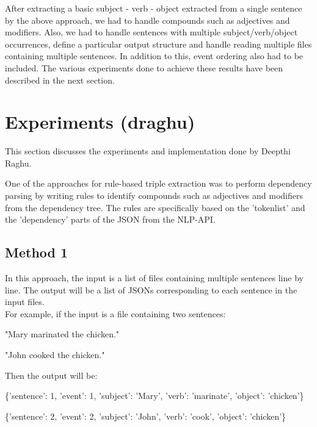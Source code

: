 \documentclass[11pt,letterpaper]{article}
\begin{document}
After extracting a basic subject - verb - object extracted from a single sentence by the above approach, we had to handle compounds such as adjectives and modifiers. Also, we had to handle sentences with multiple subject/verb/object occurrences, define a particular output structure and handle reading multiple files containing multiple sentences. In addition to this, event ordering also had to be included. The various experiments done to achieve these results have been described in the next section. 

\section{Experiments (draghu)}
This section discusses the experiments and implementation done by Deepthi Raghu.

\noindent \newline
One of the approaches for rule-based triple extraction was to perform dependency parsing by writing rules to identify compounds such as adjectives and modifiers from the dependency tree. The rules are specifically based on the 'tokenlist' and the 'dependency' parts of the JSON from the NLP-API. 

\subsection{Method 1}
In this approach, the input is a list of files containing multiple sentences line by line. The output will be a list of JSONs corresponding to each sentence in the input files. \\
\noindent
For example, if the input is a file containing two sentences:

"Mary marinated the chicken." 

"John cooked the chicken."

\noindent \newline
Then the output will be:

\{'sentence': 1, 'event': 1, 'subject': 'Mary', 'verb': 'marinate', 'object': 'chicken'\}

\{'sentence': 2, 'event': 2, 'subject': 'John', 'verb': 'cook', 'object': 'chicken'\}
\end{document}
